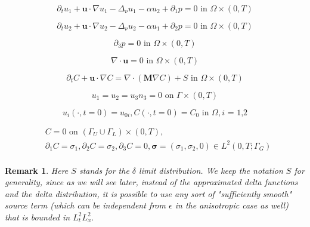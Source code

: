 \documentclass[11pt]{article}
\newtheorem{remark}{Remark}
\begin{document}
    \begin{equation} \label{HNSC1}    
    \partial_t u_1 + \mathbf{u} \cdot \nabla u_1 - \Delta_\nu u_1 -\alpha u_2 + \partial_1 p = 0 \text{ in } \Omega \times (0,T)
    \end{equation}
    
    \begin{equation} \label{HNSC2}   
    \partial_t u_2 + \mathbf{u} \cdot \nabla u_2 - \Delta_\nu u_2 -\alpha u_1 + \partial_2 p = 0 \text{ in } \Omega \times (0,T)
    \end{equation}
    
    \begin{equation} \label{HNSC3}   
    \partial_3 p = 0 \text{ in } \Omega \times (0,T)
    \end{equation}
    
    \begin{equation} \label{HNSC4}   
    \nabla \cdot \mathbf{u} = 0 \text{ in } \Omega \times (0,T)
    \end{equation}
    
    \begin{equation} \label{HNSC5}   
    \partial_t C + \mathbf{u} \cdot \nabla C = \nabla \cdot (\mathbf{M} \nabla C) + S \text{ in } \Omega \times (0,T)
    \end{equation}
    
    \begin{equation} \label{HNSC6}   
    u_1 = u_2 = u_3 n_3 = 0 \text{ on } \Gamma \times (0,T)
    \end{equation}
    
    \begin{equation} \label{HNSC7}   
    u_i (\cdot, t=0) = u_{0 i}, C (\cdot, t=0) = C_0 \text{ in } \Omega, \text{$i$ = 1,2}
    \end{equation}
    
    \begin{equation} \label{HNSC8}
      \begin{split}
        &C = 0 \text{ on } ( \Gamma_U \cup \Gamma_L) \times (0,T), \\
        & \partial_1 C = \sigma_1, \partial_2 C = \sigma_2, \partial_3  C = 0, \boldsymbol{\sigma} = (\sigma_1, \sigma_2, 0) \in L^2(0,T; \Gamma_G)\\
      \end{split}
    \end{equation}
    
  \begin{remark} \label{sourceregularityremark}
    Here $S$ stands for the $\delta$ limit distribution. We keep the notation $S$ for generality, since as we will see later, instead of the approximated delta functions and the delta distribution, it is possible to use any sort of "sufficiently smooth" source term (which can be independent from $\epsilon$ in the anisotropic case as well) that is bounded in $L^2_t L^2_x.$
  \end{remark}
\end{document}
